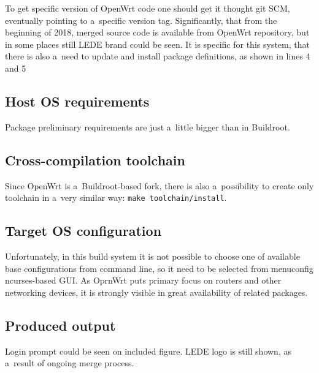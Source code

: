 \documentclass[printmode]{mgr}
\begin{document}
To get specific version of OpenWrt code one should get it thought git SCM, eventually pointing to a~specific version tag.
Significantly, that from the beginning of 2018, merged source code is available from OpenWrt repository, but in some places still LEDE brand could be seen.
It is specific for this system, that there is also a~need to update and install package definitions, as shown in lines 4 and 5

\subsection*{Host OS requirements}

Package preliminary requirements are just a~little bigger than in Buildroot.

\subsection*{Cross-compilation toolchain}

Since OpenWrt is a~Buildroot-based fork, there is also a~possibility to create only toolchain in a~very similar way: \verb|make toolchain/install|.

\subsection*{Target OS configuration}

Unfortunately, in this build system it is not possible to choose one of available base configurations from command line, so it need to be selected from menuconfig ncurses-based GUI.
As OprnWrt puts primary focus on routers and other networking devices, it is strongly visible in great availability of related packages.

\subsection*{Produced output}

Login prompt could be seen on included figure.
LEDE logo is still shown, as a~result of ongoing merge process.
\end{document}

